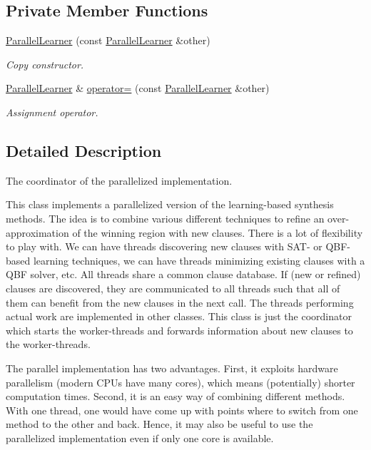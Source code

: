 \subsection*{Private Member Functions}
\begin{DoxyCompactItemize}
\item 
\hyperlink{classParallelLearner_a7857993d63e497f5c946030c3127a578}{Parallel\-Learner} (const \hyperlink{classParallelLearner}{Parallel\-Learner} \&other)
\begin{DoxyCompactList}\small\item\em Copy constructor. \end{DoxyCompactList}\item 
\hyperlink{classParallelLearner}{Parallel\-Learner} \& \hyperlink{classParallelLearner_a870e6d78e50b8aed63555e797ff6cce4}{operator=} (const \hyperlink{classParallelLearner}{Parallel\-Learner} \&other)
\begin{DoxyCompactList}\small\item\em Assignment operator. \end{DoxyCompactList}\end{DoxyCompactItemize}


\subsection{Detailed Description}
The coordinator of the parallelized implementation. 

This class implements a parallelized version of the learning-\/based synthesis methods. The idea is to combine various different techniques to refine an over-\/approximation of the winning region with new clauses. There is a lot of flexibility to play with. We can have threads discovering new clauses with S\-A\-T-\/ or Q\-B\-F-\/based learning techniques, we can have threads minimizing existing clauses with a Q\-B\-F solver, etc. All threads share a common clause database. If (new or refined) clauses are discovered, they are communicated to all threads such that all of them can benefit from the new clauses in the next call. The threads performing actual work are implemented in other classes. This class is just the coordinator which starts the worker-\/threads and forwards information about new clauses to the worker-\/threads.

The parallel implementation has two advantages. First, it exploits hardware parallelism (modern C\-P\-Us have many cores), which means (potentially) shorter computation times. Second, it is an easy way of combining different methods. With one thread, one would have come up with points where to switch from one method to the other and back. Hence, it may also be useful to use the parallelized implementation even if only one core is available.


